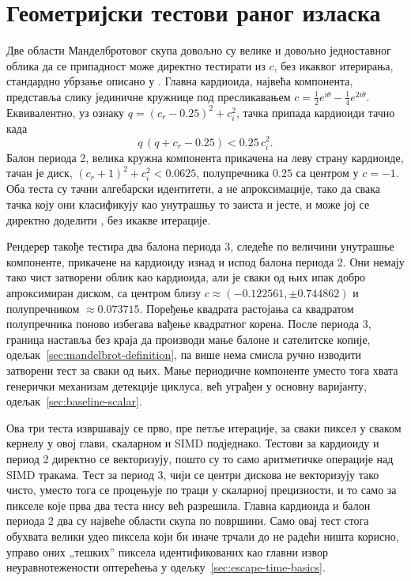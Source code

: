 \documentclass[serbian]{ftndiplomski}
\begin{document}
\noindent\begin{minipage}{\linewidth}

\end{minipage}

\section{Геометријски тестови раног изласка}
\label{sec:early-exit}

Две области Манделбротовог скупа довољно су велике и довољно једноставног облика да се
припадност може директно тестирати из $c$, без икаквог итерирања, стандардно убрзање
описано у \cite{peitgensaupe1988}. Главна кардиоида, највећа компонента, представља
слику јединичне кружнице под пресликавањем $c = \tfrac{1}{2}e^{i\theta} -
\tfrac{1}{4}e^{2i\theta}$. Еквивалентно, уз ознаку $q = (c_r - 0.25)^2 + c_i^2$, тачка
припада кардиоиди тачно када
\begin{equation}
  \label{eq:cardioid-test}
  q \, (q + c_r - 0.25) < 0.25 \, c_i^2 .
\end{equation}
Балон периода 2, велика кружна компонента прикачена на леву страну кардиоиде, тачан је
диск, $(c_r + 1)^2 + c_i^2 < 0.0625$, полупречника $0.25$ са центром у $c = -1$. Оба
теста су тачни алгебарски идентитети, а не апроксимације, тако да свака тачка коју они
класификују као унутрашњу то заиста и јесте, и може јој се директно доделити
, без икакве итерације.

Рендерер такође тестира два балона периода 3, следеће по величини унутрашње
компоненте, прикачене на кардиоиду изнад и испод балона периода 2. Они немају тако чист
затворени облик као кардиоида, али је сваки од њих ипак добро апроксимиран диском, са
центром близу $c \approx (-0.122561, \pm0.744862)$ и полупречником $\approx 0.073715$.
Поређење квадрата растојања са квадратом полупречника поново избегава вађење квадратног
корена. После периода $3$, граница наставља без краја да производи мање балоне и
сателитске копије, одељак~\ref{sec:mandelbrot-definition}, па више нема смисла ручно
изводити затворени тест за сваки од њих. Мање периодичне компоненте уместо тога хвата
генерички механизам детекције циклуса, већ уграђен у основну варијанту,
одељак~\ref{sec:baseline-scalar}.

Ова три теста извршавају се прво, пре петље итерације, за сваки пиксел у сваком
кернелу у овој глави, скаларном и SIMD подједнако. Тестови за кардиоиду и период 2
директно се векторизују, пошто су то само аритметичке операције над SIMD тракама. Тест
за период 3, чији се центри дискова не векторизују тако чисто, уместо тога се
процењује по траци у скаларној прецизности, и то само за пикселе које прва два теста
нису већ разрешила. Главна кардиоида и балон периода 2 два су највеће области скупа по
површини. Само овај тест стога обухвата велики удео пиксела који би иначе трчали до
 не радећи ништа корисно, управо оних „тешких'' пиксела
идентификованих као главни извор неуравнотежености оптерећења у
одељку~\ref{sec:escape-time-basics}.
\end{document}
